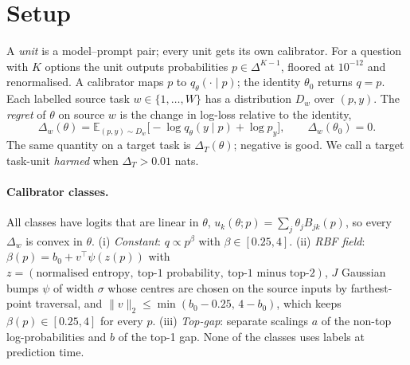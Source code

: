 \documentclass[11pt]{article}
\theoremstyle{remark}
\newcommand{\E}{\mathbb{E}}
\begin{document}
\section{Setup}\label{sec:setup}
A \emph{unit} is a model--prompt pair; every unit gets its own calibrator.
For a question with $K$ options the unit outputs probabilities $p\in\Delta^{K-1}$, floored at $10^{-12}$ and renormalised.
A calibrator maps $p$ to $q_\theta(\cdot\mid p)$; the identity $\theta_0$ returns $q=p$.
Each labelled source task $w\in\{1,\dots,W\}$ has a distribution $D_w$ over $(p,y)$.
The \emph{regret} of $\theta$ on source $w$ is the change in log-loss relative to the identity,
\begin{equation}
\Delta_w(\theta)=\E_{(p,y)\sim D_w}\big[-\log q_\theta(y\mid p)+\log p_y\big],\qquad \Delta_w(\theta_0)=0 .
\end{equation}
The same quantity on a target task is $\Delta_T(\theta)$; negative is good.
We call a target task-unit \emph{harmed} when $\Delta_T>0.01$ nats.

\paragraph{Calibrator classes.}
All classes have logits that are linear in $\theta$, $u_k(\theta;p)=\sum_j\theta_j B_{jk}(p)$, so every $\Delta_w$ is convex in $\theta$.
(i) \emph{Constant}: $q\propto p^{\beta}$ with $\beta\in[0.25,4]$.
(ii) \emph{RBF field}: $\beta(p)=b_0+v^\top\psi(z(p))$ with $z=(\text{normalised entropy},\ \text{top-1 probability},\ \text{top-1 minus top-2})$, $J$ Gaussian bumps $\psi$ of width $\sigma$ whose centres are chosen on the source inputs by farthest-point traversal, and $\|v\|_2\le\min(b_0-0.25,\,4-b_0)$, which keeps $\beta(p)\in[0.25,4]$ for every $p$.
(iii) \emph{Top-gap}: separate scalings $a$ of the non-top log-probabilities and $b$ of the top-1 gap.
None of the classes uses labels at prediction time.
\end{document}
